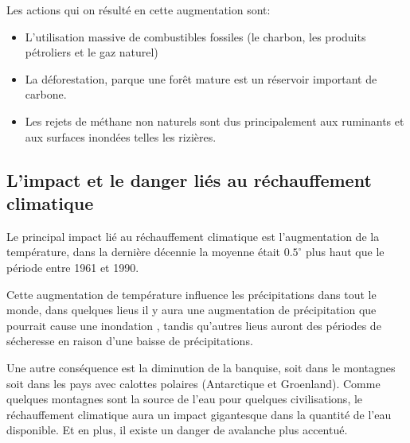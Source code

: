 \documentclass[a4paper,11pt]{article}
\begin{document}

Les actions qui on résulté en cette augmentation sont:

\begin{itemize}

\item L'utilisation massive de combustibles fossiles (le charbon, les produits
  pétroliers et le gaz naturel)

\item La  déforestation, parque une forêt  mature est un  réservoir important de
  carbone.

\item  Les  rejets  de  méthane non naturels  sont  dus  principalement  aux
  ruminants et aux surfaces inondées telles les rizières.

\end{itemize}



\subsection{L’impact et le danger liés au réchauffement climatique}

Le principal  impact lié  au réchauffement climatique  est l'augmentation  de la
température, dans la dernière décennie  la moyenne était $0.5^{\circ}$ plus haut
que le période entre 1961 et 1990.

Cette  augmentation de température  influence les  précipitations dans  tout le
monde,  dans quelques  lieus il  y aura  une augmentation  de  précipitation que
pourrait cause  une inondation , tandis  qu'autres lieus auront  des périodes de
sécheresse en raison d'une baisse de précipitations.

Une autre conséquence  est la diminution de la banquise,  soit dans le montagnes
 soit dans les pays avec calottes polaires (Antarctique et Groenland).
Comme quelques montagnes sont la source de l'eau pour quelques civilisations, le
réchauffement climatique  aura un impact  gigantesque dans la quantité  de l'eau
disponible. Et en plus, il existe un danger de avalanche plus accentué.

\end{document}
